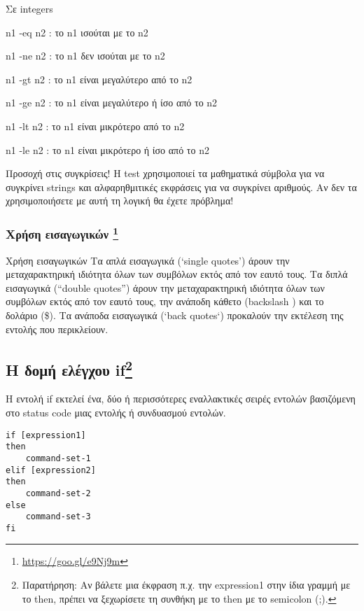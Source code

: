 \begin{packed_item}
\begin{packed_item}
	\end{packed_item}
	\item Σε integers 
	\begin{packed_item}
		\item n1 -eq n2 : το n1 ισούται με το n2
		\item n1 -ne n2 : το n1 δεν ισούται με το n2
		\item n1 -gt n2 : το n1 είναι μεγαλύτερο από το n2
		\item n1 -ge n2 : το n1 είναι μεγαλύτερο ή ίσο από το n2
		\item n1 -lt n2 : το n1 είναι μικρότερο από το n2
		\item n1 -le n2 : το n1 είναι μικρότερο ή ίσο από το n2
	\end{packed_item}
\end{packed_item}

\begin{warningbox}{Προσοχή στις συγκρίσεις!}
Η test χρησιμοποιεί τα μαθηματικά σύμβολα για να συγκρίνει strings και αλφαρηθμιτικές εκφράσεις για να συγκρίνει αριθμούς. Αν δεν τα χρησιμοποιήσετε με αυτή τη λογική θα έχετε πρόβλημα!
\end{warningbox}

\subsubsection*{Χρήση εισαγωγικών \footnote{\href{https://goo.gl/e9Nj9m}{https://goo.gl/e9Nj9m}}}
Χρήση εισαγωγικών Τα απλά εισαγωγικά (‘single quotes’) άρουν την μεταχαρακτηρική ιδιότητα όλων των συμβόλων εκτός από τον εαυτό τους. Τα διπλά εισαγωγικά (“double quotes”) άρουν την μεταχαρακτηρική ιδιότητα όλων των συμβόλων εκτός από τον εαυτό τους, την ανάποδη κάθετο (backslash ) και το δολάριο (\$). Τα ανάποδα εισαγωγικά (`back quotes`) προκαλούν την εκτέλεση της εντολής που περικλείουν.

\subsection*{Η δομή ελέγχου if\footnote{Παρατήρηση: Αν βάλετε μια έκφραση π.χ. την expression1 στην ίδια γραμμή με το then, πρέπει να
		ξεχωρίσετε τη συνθήκη με το then με το semicolon (;). 
	}}
	
Η εντολή if εκτελεί ένα, δύο ή περισσότερες εναλλακτικές σειρές εντολών βασιζόμενη στο status code μιας εντολής ή συνδυασμού εντολών.
	
\begin{lstlisting}
if [expression1] 
then
	command-set-1 
elif [expression2]
then 
	command-set-2 
else 
	command-set-3 
fi
\end{lstlisting}

